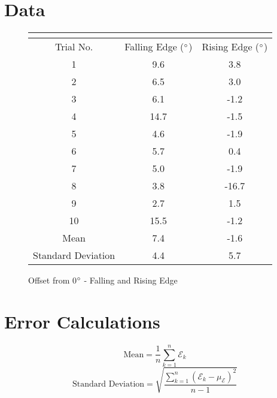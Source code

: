 \documentclass[11pt]{article}
\begin{document}
\section{Data}
\begin{figure}[h!t]
\begin{center}
\caption{Offset from 0$\degree$ - Falling and Rising Edge}
\begin{tabular}{| c | c | c |}
\multicolumn{3}{c}{} \\ \hline
\rowcolor{dblue}
Trial No. & Falling Edge ($\degree$) & Rising Edge ($\degree$) \\ \hline
1 & 9.6 & 3.8 \\ \hline
2 & 6.5 & 3.0 \\ \hline
3 & 6.1 & -1.2 \\ \hline
4 & 14.7 & -1.5 \\ \hline
5 & 4.6 & -1.9 \\ \hline
6 & 5.7 & 0.4 \\ \hline
7 & 5.0 & -1.9 \\ \hline
8 & 3.8 & -16.7 \\ \hline
9 & 2.7 & 1.5 \\ \hline
10 & 15.5 & -1.2 \\ \hline
\rowcolor{lyellow}
Mean & 7.4 & -1.6 \\\hline
\rowcolor{lred}
Standard Deviation & 4.4 & 5.7 \\ \hline
\end{tabular}
\end{center}
\end{figure}
\section{Error Calculations}
\begin{equation}
	\mbox{Mean} = \frac{1}{n} \sum_{k=1}^{n}\mathcal{E}_k
\end{equation}
\begin{equation}
	\mbox{Standard Deviation} = \sqrt{\frac{\sum_{k=1}^{n}(\mathcal{E}_k-\mu_{\mathcal{E}})^2}{n-1}}
\end{equation}
\end{document}
